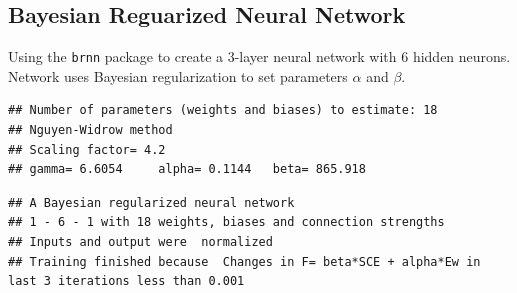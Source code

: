 \hypertarget{bayesian-reguarized-neural-network}{%
\subsection{Bayesian Reguarized Neural
Network}\label{bayesian-reguarized-neural-network}}

Using the \texttt{brnn} package \cite{brnn} to create a 3-layer neural
network with 6 hidden neurons. Network uses Bayesian regularization to
set parameters \(\alpha\) and \(\beta\).

\begin{Shaded}
\begin{Highlighting}[]
\OtherTok{\textless{}{-}}\SpecialCharTok{$}
\OtherTok{\textless{}{-}}\SpecialCharTok{$}

\OtherTok{\textless{}{-}} \SpecialCharTok{\textasciitilde{}}\NormalTok{)   }
\end{Highlighting}
\end{Shaded}

\begin{verbatim}
## Number of parameters (weights and biases) to estimate: 18 
## Nguyen-Widrow method
## Scaling factor= 4.2 
## gamma= 6.6054     alpha= 0.1144   beta= 865.918
\end{verbatim}

\begin{Shaded}
\begin{Highlighting}[]
\end{Highlighting}
\end{Shaded}

\begin{verbatim}
## A Bayesian regularized neural network 
## 1 - 6 - 1 with 18 weights, biases and connection strengths
## Inputs and output were  normalized
## Training finished because  Changes in F= beta*SCE + alpha*Ew in last 3 iterations less than 0.001
\end{verbatim}

\begin{Shaded}
\begin{Highlighting}[]
\OtherTok{\textless{}{-}}  \NormalTok{(} \NormalTok{))}
\SpecialCharTok{/}\NormalTok{(}\SpecialCharTok{\^{}}
\end{Highlighting}
\end{Shaded}

